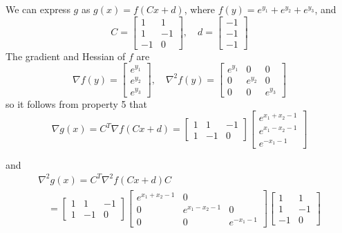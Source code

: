 \begin{example}
We can express $ g $ as $ g(x)=f(C x+d) $, where $ f(y)=e^{y_{1}}+e^{y_{2}}+e^{y_{3}} $, and
$$
C=\left[\begin{array}{rr}
1 & 1 \\
1 & -1 \\
-1 & 0
\end{array}\right], \quad d=\left[\begin{array}{l}
-1 \\
-1 \\
-1
\end{array}\right]
$$
The gradient and Hessian of $ f $ are
$$
\nabla f(y)=\left[\begin{array}{c}
e^{y_{1}} \\
e^{y_{2}} \\
e^{y_{3}}
\end{array}\right], \quad \nabla^{2} f(y)=\left[\begin{array}{ccc}
e^{y_{1}} & 0 & 0 \\
0 & e^{y_{2}} & 0 \\
0 & 0 & e^{y_{3}}
\end{array}\right]
$$
so it follows from property 5 that
$$
\nabla g(x)=C^{T} \nabla f(C x+d)=\left[\begin{array}{rrr}
1 & 1 & -1 \\
1 & -1 & 0
\end{array}\right]\left[\begin{array}{c}
e^{x_{1}+x_{2}-1} \\
e^{x_{1}-x_{2}-1} \\
e^{-x_{1}-1}
\end{array}\right]
$$

and
$$
\begin{array}{l}
\nabla^{2} g(x)=C^{T} \nabla^{2} f(C x+d) C \\
\quad=\left[\begin{array}{rrr}
1 & 1 & -1 \\
1 & -1 & 0
\end{array}\right]\left[\begin{array}{ccc}
e^{x_{1}+x_{2}-1} & 0 & \\
0 & e^{x_{1}-x_{2}-1} & 0 \\
0 & 0 & e^{-x_{1}-1}
\end{array}\right]\left[\begin{array}{rr}
1 & 1 \\
1 & -1 \\
-1 & 0
\end{array}\right]
\end{array}
$$
\end{example}

